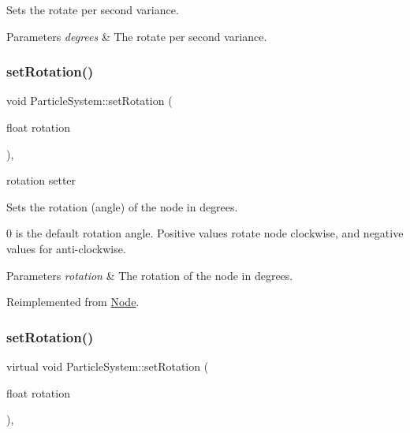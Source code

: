 Sets the rotate per second variance.


\begin{DoxyParams}{Parameters}
{\em degrees} & The rotate per second variance. \\
\hline
\end{DoxyParams}
\mbox{\label{classParticleSystem_ad3fffe8df2aafe8a5bbf9402b0dbe4a3}} 
\subsubsection{\texorpdfstring{set\+Rotation()}{setRotation()}\hspace{0.1cm}{\footnotesize\ttfamily [1/2]}}
{\footnotesize\ttfamily void Particle\+System\+::set\+Rotation (\begin{DoxyParamCaption}\item[{float}]{rotation }\end{DoxyParamCaption})\hspace{0.3cm}{\ttfamily [override]}, {\ttfamily [virtual]}}



rotation setter 

Sets the rotation (angle) of the node in degrees.

0 is the default rotation angle. Positive values rotate node clockwise, and negative values for anti-\/clockwise.


\begin{DoxyParams}{Parameters}
{\em rotation} & The rotation of the node in degrees. \\
\hline
\end{DoxyParams}


Reimplemented from \hyperlink{classNode_a62dda439f77712f0d9b405ce887df676}{Node}.

\mbox{\label{classParticleSystem_a0616c2ca4a0618b811c692e30aa9213f}} 
\subsubsection{\texorpdfstring{set\+Rotation()}{setRotation()}\hspace{0.1cm}{\footnotesize\ttfamily [2/2]}}
{\footnotesize\ttfamily virtual void Particle\+System\+::set\+Rotation (\begin{DoxyParamCaption}\item[{float}]{rotation }\end{DoxyParamCaption})\hspace{0.3cm}{\ttfamily [override]}, {\ttfamily [virtual]}}



